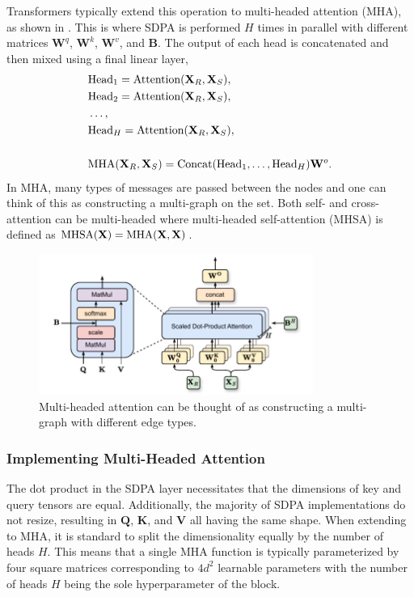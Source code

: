 Transformers typically extend this operation to multi-headed attention (MHA), as shown in .
This is where SDPA is performed $H$ times in parallel with different matrices $\mathbf{W}^q$, $\mathbf{W}^k$, $\mathbf{W}^v$, and $\mathbf{B}$.
The output of each head is concatenated and then mixed using a final linear layer,
\begin{equation}
    \begin{aligned}
    & \text{Head}_1 = \text{Attention}(\mathbf{X}_R, \mathbf{X}_S), \\
    & \text{Head}_2 = \text{Attention}(\mathbf{X}_R, \mathbf{X}_S), \\
    & \ldots, \\
    & \text{Head}_H = \text{Attention}(\mathbf{X}_R, \mathbf{X}_S), \\
    \vphantom{x} \\
    & \text{MHA}(\mathbf{X}_R, \mathbf{X}_S) = \text{Concat}(\text{Head}_1, \ldots, \text{Head}_H) \mathbf{W}^o.
    \end{aligned}
\end{equation}
In MHA, many types of messages are passed between the nodes and one can think of this as constructing a multi-graph on the set.
Both self- and cross-attention can be multi-headed where multi-headed self-attention (MHSA) is defined as $\text{MHSA}(\mathbf{X}) = \text{MHA}(\mathbf{X}, \mathbf{X})$.

\begin{figure}
    \centering
    \includegraphics[width=0.8\textwidth]{Figures/transformers/mha.pdf}
    \caption{Multi-headed attention can be thought of as constructing a multi-graph with different edge types.}
    \label{fig:mha}
\end{figure}

\subsubsection{Implementing Multi-Headed Attention}

The dot product in the SDPA layer necessitates that the dimensions of key and query tensors are equal.
Additionally, the majority of SDPA implementations do not resize, resulting in $\mathbf{Q}$, $\mathbf{K}$, and $\mathbf{V}$ all having the same shape.
When extending to MHA, it is standard to split the dimensionality equally by the number of heads $H$.
This means that a single MHA function is typically parameterized by four square matrices corresponding to $4d^2$ learnable parameters with the number of heads $H$ being the sole hyperparameter of the block.

